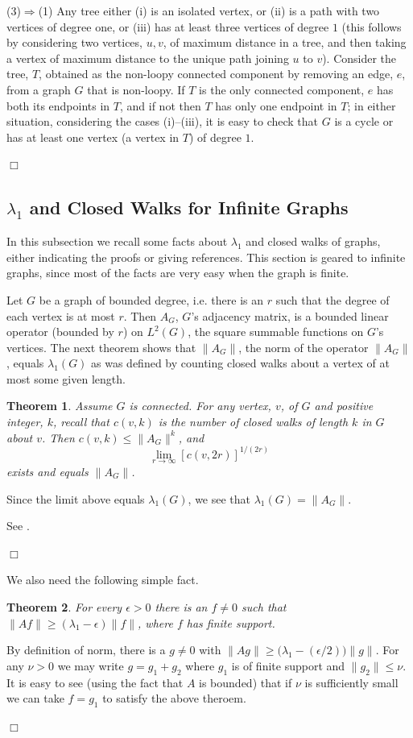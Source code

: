 \documentclass[12pt]{article}
\newtheorem{theorem}{Theorem}[section]
\newcommand{\proof}{{\par\noindent {\bf Proof}\space\space}}
\newcommand{\proofbox}{\begin{flushright}$\Box$\end{flushright}}
\begin{document}
(3)$\Rightarrow$(1)
Any tree either (i) is an isolated vertex, or (ii) is a path with two
vertices of degree one, or (iii) has at least three vertices of degree
$1$ (this follows by considering two vertices, $u,v$, of maximum distance in
a tree, and then taking a vertex of maximum distance to the unique
path joining $u$ to $v$).  
Consider the tree, $T$, obtained as the
non-loopy connected component by removing an edge, $e$, from a graph
$G$ that is non-loopy.  If $T$ is the only connected component, $e$
has both its endpoints in $T$, and if not then $T$ has only one endpoint
in $T$; in either situation, considering the cases (i)--(iii), it is
easy to check that $G$ is a cycle or has at least
one vertex (a vertex in $T$) of degree $1$.
\proofbox


\subsection{$\lambda_1$ and Closed Walks for Infinite
Graphs}

In this subsection we recall some facts about $\lambda_1$ and closed walks of
graphs, either indicating the proofs or giving references.  This section
is geared to infinite graphs, since most of the facts are very easy when
the graph is finite.

Let $G$ be a graph of bounded degree, i.e. there is an $r$ such that
the degree of each vertex is at most $r$.
Then $A_G$, $G$'s adjacency matrix, is a bounded linear operator (bounded
by $r$) on $L^2(G)$, the square summable functions on $G$'s vertices.
The next theorem shows that $\|A_G\|$, the norm of the operator $\|A_G\|$,
equals $\lambda_1(G)$ as was defined by counting closed walks about a 
vertex of at most some given length.
\begin{theorem} Assume $G$ is connected.  For any vertex, $v$, of $G$ and
positive integer, $k$, recall that
$c(v,k)$ is the number of closed walks of length $k$ in $G$ about $v$.  Then
$c(v,k)\le \|A_G\|^k$, and
$$
\lim_{r\to\infty} [c(v,2r)]^{1/(2r)}
$$
exists and equals $\|A_G\|$.
\end{theorem}
Since the limit above equals $\lambda_1(G)$, we see that 
$\lambda_1(G)=\|A_G\|$.
\proof See \cite{buck}.
\proofbox

We also need the following simple fact.
\begin{theorem} For every $\epsilon>0$ there is an $f\ne 0$ such that
$\|Af\|\ge(\lambda_1-\epsilon)\|f\|$, where $f$ has finite support.
\end{theorem}
\proof By definition of norm, there is a $g\ne 0$ with
$\|Ag\|\ge\bigl(\lambda_1-(\epsilon/2)\bigr)\|g\|$.  For any $\nu>0$
we may write $g=g_1+g_2$ where $g_1$ is of finite support and $\|g_2\|\le
\nu$.  It is easy to see (using the fact that $A$ is bounded) that
if $\nu$ is sufficiently small we can take $f=g_1$ to satisfy the
above theroem.
\proofbox
\end{document}
